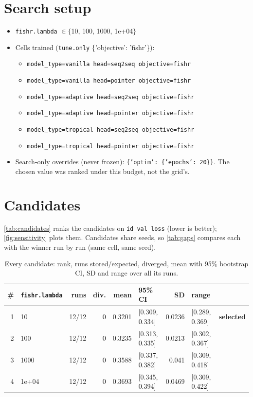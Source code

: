 \documentclass[10pt]{article}
\begin{document}
\section{Search setup}
\begin{itemize}\setlength\itemsep{0pt}
\item \texttt{fishr.lambda} $\in \{$10, 100, 1000, 1e+04$\}$
\item Cells trained (\texttt{tune.only} \{'objective': 'fishr'\}):
\begin{itemize}\setlength\itemsep{0pt}
\item \texttt{model\_type=vanilla head=seq2seq objective=fishr}
\item \texttt{model\_type=vanilla head=pointer objective=fishr}
\item \texttt{model\_type=adaptive head=seq2seq objective=fishr}
\item \texttt{model\_type=adaptive head=pointer objective=fishr}
\item \texttt{model\_type=tropical head=seq2seq objective=fishr}
\item \texttt{model\_type=tropical head=pointer objective=fishr}
\end{itemize}
\item Search-only overrides (never frozen): \texttt{\{'optim': \{'epochs': 20\}\}}. The chosen value was ranked under this budget, not the grid's.
\end{itemize}

\section{Candidates}
\autoref{tab:candidates} ranks the candidates on \texttt{id\_val\_loss} (lower is better); \autoref{fig:sensitivity} plots them.
Candidates share seeds, so \autoref{tab:gaps} compares each with the winner run by run (same cell, same seed).

{\small
\begin{longtable}{rlrrrlrll}
\caption{Every candidate: rank, runs stored/expected, diverged, mean with 95\% bootstrap CI, SD and range over all its runs.}\label{tab:candidates}\\
\toprule
\# & \texttt{fishr.lambda} & runs & div. & mean & 95\% CI & SD & range & \\
\midrule
\endhead
1 & 10 & 12/12 & 0 & 0.3201 & [0.309, 0.334] & 0.0236 & [0.289, 0.369] & \textbf{selected}\\
2 & 100 & 12/12 & 0 & 0.3235 & [0.313, 0.335] & 0.0213 & [0.302, 0.367] & \\
3 & 1000 & 12/12 & 0 & 0.3588 & [0.337, 0.382] & 0.041 & [0.309, 0.418] & \\
4 & 1e+04 & 12/12 & 0 & 0.3693 & [0.345, 0.394] & 0.0469 & [0.309, 0.422] & \\
\bottomrule
\end{longtable}
}
\end{document}
